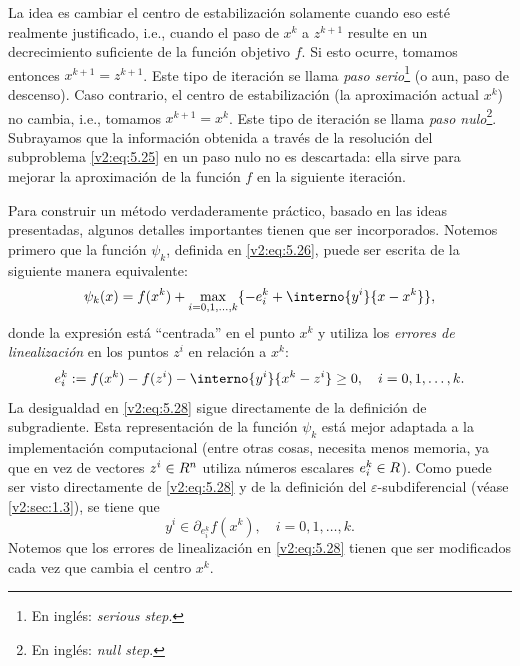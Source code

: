 La idea es cambiar el centro de estabilización solamente cuando eso esté realmente justificado, i.e., cuando el paso de $x^k$ a $z^{k+1}$ resulte en un decrecimiento suficiente de la función objetivo $f$. Si esto ocurre, tomamos entonces $x^{k+1} = z^{k+1}$. Este tipo de iteración se llama \textit{paso serio}\footnote{En inglés: \textit{serious step}.} (o aun, paso de descenso). Caso contrario, el centro de estabilización (la aproximación actual $x^k$) no cambia, i.e., tomamos $x^{k+1} = x^k$. Este tipo de iteración se llama \textit{paso nulo}\footnote{En inglés: \textit{null step}.}. Subrayamos que la información obtenida a través de la resolución del subproblema \eqref{v2:eq:5.25} en un paso nulo no es descartada: ella sirve para mejorar la aproximación de la función $f$ en la siguiente iteración.

Para construir un método verdaderamente práctico, basado en las ideas presentadas, algunos detalles importantes tienen que ser incorporados. Notemos primero que la función $\psi_k$, definida en \eqref{v2:eq:5.26}, puede ser escrita de la siguiente manera equivalente:
\begin{equation}
    \psi_k(x) = f(x^k) + \max_{i=0, 1, \dots, k} \{ -e_i^k + \interno{y^i}{x - x^k} \},
    \label{v2:eq:5.27}
\end{equation}
donde la expresión está ``centrada'' en el punto $x^k$ y utiliza los \textit{errores de linealización} en los puntos $z^i$ en relación a $x^k$:
\begin{equation}
    e_i^k := f(x^k) - f(z^i) - \interno{y^i}{x^k - z^i} \ge 0, \quad i = 0, 1, \dots, k.
    \label{v2:eq:5.28}
\end{equation}
La desigualdad en \eqref{v2:eq:5.28} sigue directamente de la definición de subgradiente. Esta representación de la función $\psi_k$ está mejor adaptada a la implementación computacional (entre otras cosas, necesita menos memoria, ya que en vez de vectores $z^i \in R^n$ utiliza números escalares $e_i^k \in R$). Como puede ser visto directamente de \eqref{v2:eq:5.28} y de la definición del $\varepsilon$-subdiferencial (véase \cref{v2:sec:1.3}), se tiene que
\begin{equation}
    y^i \in \partial_{e_i^k} f(x^k), \quad i = 0, 1, \dots, k.
    \label{v2:eq:5.29}
\end{equation}
Notemos que los errores de linealización en \eqref{v2:eq:5.28} tienen que ser modificados cada vez que cambia el centro $x^k$.

